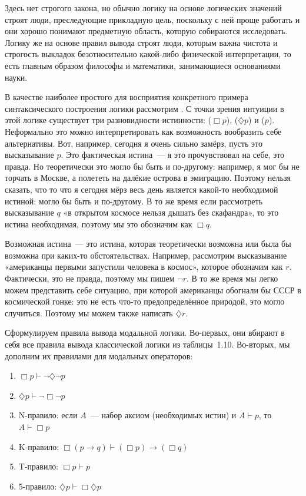Здесь нет строгого закона, но обычно логику на основе логических значений строят люди, преследующие прикладную цель, поскольку с ней проще работать и они хорошо понимают предметную область, которую собираются исследовать. Логику же на основе правил вывода строят люди, которым важна чистота и строгость выкладок безотносительно какой-либо физической интерпретации, то есть главным образом философы и математики, занимающиеся основаниями науки.

В качестве наиболее простого для восприятия конкретного примера синтаксического построения логики рассмотрим . С точки зрения интуиции в этой логике существует три разновидности истинности:  ($\Box p$),  ($\diamondsuit p$) и  ($p$). Неформально это можно интерпретировать как возможность вообразить себе альтернативы. Вот, например, сегодня я очень сильно замёрз, пусть это высказывание $p$. Это фактическая истина~— я это прочувствовал на себе, это правда. Но теоретически это могло бы быть и по-другому: например, я мог бы не торчать в Москве, а полететь на далёкие острова в эмиграцию. Поэтому нельзя сказать, что то что я сегодня мёрз весь день является какой-то необходимой истиной: могло бы быть и по-другому. В то же время если рассмотреть высказывание $q$ «в открытом космосе нельзя дышать без скафандра», то это истина необходимая, поэтому мы это обозначим как $\Box q$.

Возможная истина~— это истина, которая теоретически возможна или была бы возможна при каких-то обстоятельствах. Например, рассмотрим высказывание «американцы первыми запустили человека в космос», которое обозначим как $r$. Фактически, это не правда, поэтому мы пишем $\neg r$. В то же время мы легко можем представить себе ситуацию, при которой американцы обогнали бы СССР в космической гонке: это не есть что-то предопределённое природой, это могло случиться. Поэтому мы можем также написать $\diamondsuit r$. 

Сформулируем правила вывода модальной логики. Во-первых, они вбирают в себя все правила вывода классической логики из таблицы~1.10. Во-вторых, мы дополним их правилами для модальных операторов:

\begin{enumerate}
\item $\Box p \vdash \neg \diamondsuit \neg p$
\item $\diamondsuit p \vdash \neg \Box \neg p$
\item N-правило: если $A$~— набор аксиом (необходимых истин) и $A\vdash p$, то $A\vdash \Box p$
\item K-правило: $\Box (p\to q) \vdash (\Box p) \to (\Box q)$
\item T-правило: $\Box p \vdash p$
\item 5-правило: $\diamondsuit p \vdash \Box \diamondsuit p$
\end{enumerate}


